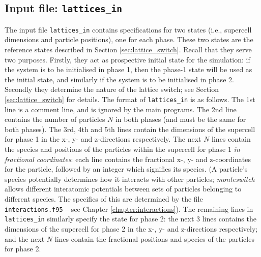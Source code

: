 \documentclass{report}
\begin{document}
\subsection{Input file: \texttt{lattices\_in}}\label{sec:lattices_in}
The input file \texttt{lattices\_in} contains specifications for two states (i.e., supercell dimensions and particle positions), one for
each phase. These two states are the reference states described in Section \ref{sec:lattice_switch}. Recall that they serve two purposes. Firstly,
they act as prospective initial state for the simulation: if the system is to be initialised in phase 1, then the phase-1 state will be used as 
the initial state, and similarly if the system is to be initialised in phase 2. Secondly they determine the nature of the lattice switch; see
Section \ref{sec:lattice_switch} for details.
The format of \texttt{lattices\_in} is as follows. The 1st line is a comment line, and is ignored by the main programs. The 2nd line contains
the number of particles $N$ in both phases (and must be the same for both phases). The 3rd, 4th and 5th lines contain the dimensions of the
supercell for phase 1 in the x-, y- and z-directions respectively. The next $N$ lines contain the species and positions of the particles within 
the supercell for phase 1 \emph{in fractional coordinates}: each line contains the fractional x-, y- and z-coordinates for the particle, followed 
by an integer which signifies its species. (A particle's species potentially determines how it interacts with other particles; \emph{monteswitch} 
allows different interatomic potentials between sets of particles belonging to different species. The specifics of this are determined by the file 
\texttt{interactions.f95} -- see Chapter \ref{chapter:interactions}). The remaining lines in \texttt{lattices\_in} similarly specify the state 
for phase 2: the next 3 lines contains the dimensions of the supercell for phase 2 in the x-, y- and z-directions respectively; and the next $N$ 
lines contain the fractional positions and species of the particles for phase 2.
\end{document}

